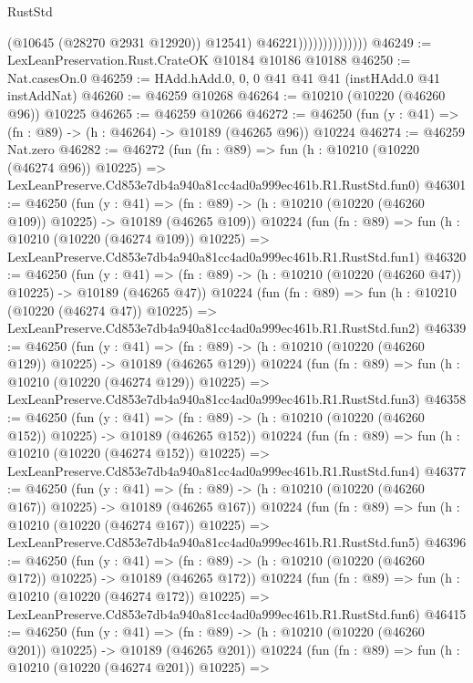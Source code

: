 \begin{lexlean}{RustStd}
\begin{coremodule}
                                  (@10645 (@28270 @2931 @12920))
                                  @12541)
                                @46221))))))))))))))
@46249 := LexLeanPreservation.Rust.CrateOK @10184 @10186 @10188
@46250 := Nat.casesOn.{0}
@46259 := HAdd.hAdd.{0, 0, 0} @41 @41 @41 (instHAdd.{0} @41 instAddNat)
@46260 := @46259 @10268
@46264 := @10210 (@10220 (@46260 @96)) @10225
@46265 := @46259 @10266
@46272 := @46250 (fun (y : @41) => (fn : @89) -> (h : @46264) -> @10189 (@46265 @96)) @10224
@46274 := @46259 Nat.zero
@46282 := @46272
    (fun (fn : @89) =>
    fun (h : @10210 (@10220 (@46274 @96)) @10225) =>
    LexLeanPreserve.Cd853e7db4a940a81cc4ad0a999ec461b.R1.RustStd.fun0)
@46301 := @46250
    (fun (y : @41) =>
    (fn : @89) -> (h : @10210 (@10220 (@46260 @109)) @10225) -> @10189 (@46265 @109))
    @10224
    (fun (fn : @89) =>
    fun (h : @10210 (@10220 (@46274 @109)) @10225) =>
    LexLeanPreserve.Cd853e7db4a940a81cc4ad0a999ec461b.R1.RustStd.fun1)
@46320 := @46250
    (fun (y : @41) =>
    (fn : @89) -> (h : @10210 (@10220 (@46260 @47)) @10225) -> @10189 (@46265 @47))
    @10224
    (fun (fn : @89) =>
    fun (h : @10210 (@10220 (@46274 @47)) @10225) =>
    LexLeanPreserve.Cd853e7db4a940a81cc4ad0a999ec461b.R1.RustStd.fun2)
@46339 := @46250
    (fun (y : @41) =>
    (fn : @89) -> (h : @10210 (@10220 (@46260 @129)) @10225) -> @10189 (@46265 @129))
    @10224
    (fun (fn : @89) =>
    fun (h : @10210 (@10220 (@46274 @129)) @10225) =>
    LexLeanPreserve.Cd853e7db4a940a81cc4ad0a999ec461b.R1.RustStd.fun3)
@46358 := @46250
    (fun (y : @41) =>
    (fn : @89) -> (h : @10210 (@10220 (@46260 @152)) @10225) -> @10189 (@46265 @152))
    @10224
    (fun (fn : @89) =>
    fun (h : @10210 (@10220 (@46274 @152)) @10225) =>
    LexLeanPreserve.Cd853e7db4a940a81cc4ad0a999ec461b.R1.RustStd.fun4)
@46377 := @46250
    (fun (y : @41) =>
    (fn : @89) -> (h : @10210 (@10220 (@46260 @167)) @10225) -> @10189 (@46265 @167))
    @10224
    (fun (fn : @89) =>
    fun (h : @10210 (@10220 (@46274 @167)) @10225) =>
    LexLeanPreserve.Cd853e7db4a940a81cc4ad0a999ec461b.R1.RustStd.fun5)
@46396 := @46250
    (fun (y : @41) =>
    (fn : @89) -> (h : @10210 (@10220 (@46260 @172)) @10225) -> @10189 (@46265 @172))
    @10224
    (fun (fn : @89) =>
    fun (h : @10210 (@10220 (@46274 @172)) @10225) =>
    LexLeanPreserve.Cd853e7db4a940a81cc4ad0a999ec461b.R1.RustStd.fun6)
@46415 := @46250
    (fun (y : @41) =>
    (fn : @89) -> (h : @10210 (@10220 (@46260 @201)) @10225) -> @10189 (@46265 @201))
    @10224
    (fun (fn : @89) =>
    fun (h : @10210 (@10220 (@46274 @201)) @10225) =>

\end{coremodule}
\end{lexlean}
